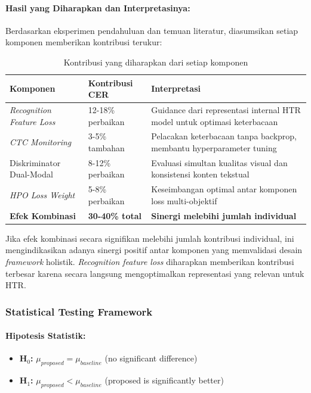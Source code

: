 \documentclass[12pt,a4paper]{article}
\begin{document}
\paragraph{Hasil yang Diharapkan dan Interpretasinya:}
Berdasarkan eksperimen pendahuluan dan temuan literatur, diasumsikan setiap komponen memberikan kontribusi terukur:

\begin{table}[H]
\centering
\caption{Kontribusi yang diharapkan dari setiap komponen}
\label{tab:expected-ablation-results}
\small
\begin{tabular}{|l|l|p{5.5cm}|}
\hline
\textbf{Komponen} & \textbf{Kontribusi CER} & \textbf{Interpretasi} \\ \hline
\textit{Recognition Feature Loss} & 12-18\% perbaikan & Guidance dari representasi internal HTR model untuk optimasi keterbacaan \\ \hline
\textit{CTC Monitoring} & 3-5\% tambahan & Pelacakan keterbacaan tanpa backprop, membantu hyperparameter tuning \\ \hline
Diskriminator Dual-Modal & 8-12\% perbaikan & Evaluasi simultan kualitas visual dan konsistensi konten tekstual \\ \hline
\textit{HPO Loss Weight} & 5-8\% perbaikan & Keseimbangan optimal antar komponen loss multi-objektif \\ \hline
\textbf{Efek Kombinasi} & \textbf{30-40\% total} & \textbf{Sinergi melebihi jumlah individual} \\ \hline
\end{tabular}
\end{table}

Jika efek kombinasi secara signifikan melebihi jumlah kontribusi individual, ini mengindikasikan adanya sinergi positif antar komponen yang memvalidasi desain \textit{framework} holistik. \textit{Recognition feature loss} diharapkan memberikan kontribusi terbesar karena secara langsung mengoptimalkan representasi yang relevan untuk HTR.

\subsubsection{Statistical Testing Framework}
\paragraph{Hipotesis Statistik:}
\begin{itemize}[leftmargin=*, nosep]
\item \textbf{H$_0$:} $\mu_{proposed} = \mu_{baseline}$ (no significant difference)
\item \textbf{H$_1$:} $\mu_{proposed} < \mu_{baseline}$ (proposed is significantly better)
\end{itemize}
\end{document}
